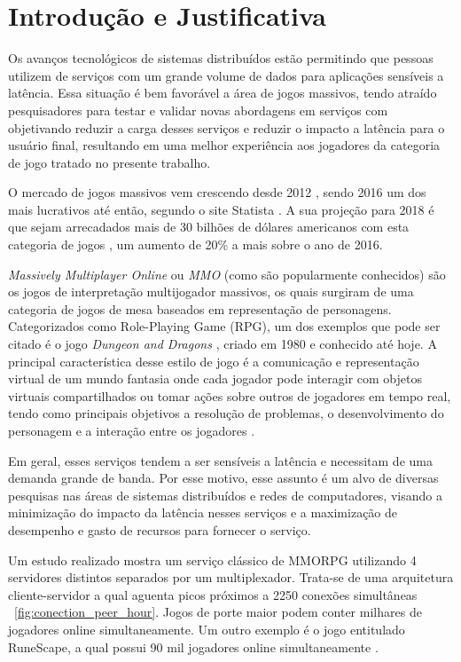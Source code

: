\section{Introdução e Justificativa}
\label{sec:int}

Os avanços tecnológicos de sistemas distribuídos estão permitindo que pessoas utilizem de serviços com um grande volume de dados para aplicações sensíveis a latência. Essa situação é bem favorável a área de jogos massivos, tendo atraído pesquisadores para testar e validar novas abordagens em serviços com objetivando reduzir a carga desses serviços e reduzir o impacto a latência para o usuário final, resultando em uma melhor experiência aos jogadores da categoria de jogo tratado no presente trabalho\cite{mmo_analytic}.

O mercado de jogos massivos vem crescendo desde 2012 \cite{new_york_times}, sendo 2016 um dos mais lucrativos até então, segundo o site Statista \cite{statista_2016}. A sua projeção para 2018 é que sejam arrecadados mais de 30 bilhões de dólares americanos com esta categoria de jogos \cite{statista_2018}, um aumento de 20\% a mais sobre o ano de 2016.

\textit{Massively Multiplayer Online} ou \textit{MMO} (como são popularmente conhecidos) são os jogos de interpretação multijogador massivos, os quais surgiram de uma categoria de jogos de mesa baseados em representação de personagens. Categorizados como Role-Playing Game (RPG), um dos exemplos que pode ser citado é o jogo \textit{Dungeon and Dragons} \cite{tsr1980dungeons},  criado em 1980 e conhecido até hoje. A principal característica desse estilo de jogo é a comunicação e representação virtual de um mundo fantasia onde cada jogador pode interagir com objetos virtuais compartilhados ou tomar ações sobre outros de jogadores em tempo real, tendo como principais objetivos a resolução de problemas, o desenvolvimento do personagem e a interação entre os jogadores \cite{video_game_technologies}.

Em geral, esses serviços tendem a ser sensíveis a latência e necessitam de uma demanda grande de banda. Por esse motivo, esse assunto é um alvo de diversas pesquisas nas áreas de sistemas distribuídos e redes de computadores, visando a minimização do impacto da latência nesses serviços \cite{stephenclarkewillson2017} e a maximização de desempenho e gasto de recursos para fornecer o serviço.

Um estudo realizado \cite{system_performance} mostra um serviço clássico de MMORPG utilizando 4 servidores distintos separados por um multiplexador. Trata-se de uma arquitetura cliente-servidor a qual aguenta picos próximos a 2250 conexões simultâneas ~\ref{fig:conection_peer_hour}. Jogos de porte maior podem conter milhares de jogadores online simultaneamente. Um outro exemplo é o jogo entitulado RuneScape, a qual possui 90 mil jogadores online simultaneamente \cite{runescape_online_users}.

